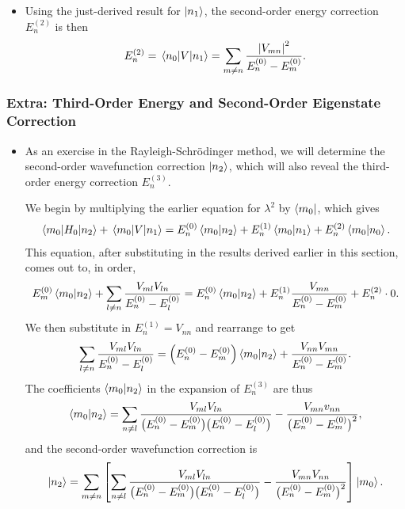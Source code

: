 \documentclass[11pt, a4paper]{article}
\newcommand{\Schro}{Schr\"{o}dinger\xspace}
\begin{document}
\begin{itemize}
    \item Using the just-derived result for $ \ket{n_{1}} $, the second-order energy correction $ E_{n}^{(2)} $ is then
    \begin{equation*}
        E_{n}^{(2)} = \mel{n_{0}}{V}{n_{1}} = \sum_{m \neq n} \frac{\abs{V_{mn}}^{2}}{E_{n}^{(0)} - E_{m}^{(0)}}.
    \end{equation*}

\end{itemize}

\subsubsection{Extra: Third-Order Energy and Second-Order Eigenstate Correction}
\begin{itemize}
    \item As an exercise in the Rayleigh-\Schro method, we will determine the second-order wavefunction correction $ \ket{n_{2}} $, which will also reveal the third-order energy correction $ E_{n}^{(3)} $. 

    We begin by multiplying the earlier equation for $ \lambda^{2} $ by $ \bra{m_{0}} $, which gives
    \begin{align*}
        \mel{m_{0}}{H_{0}}{n_{2}} + \mel{m_{0}}{V}{n_{1}} = E_{n}^{(0)} \braket{m_{0}}{n_{2}} + E_{n}^{(1)} \braket{m_{0}}{n_{1}} + E_{n}^{(2)}\braket{m_{0}}{n_{0}}.
    \end{align*}
    This equation, after substituting in the results derived earlier in this section, comes out to, in order,
    \begin{equation*}
        E_{m}^{(0)}\braket{m_{0}}{n_{2}} + \sum_{l \neq n}\frac{V_{ml}V_{ln}}{E_{n}^{(0)} - E_{l}^{(0)}} = E_{n}^{(0)}\braket{m_{0}}{n_{2}} + E_{n}^{(1)} \frac{V_{mn}}{E_{n}^{(0)} - E_{m}^{(0)}} + E_{n}^{(2)}\cdot 0.
    \end{equation*}
    We then substitute in $ E_{n}^{(1)} = V_{nn} $ and rearrange to get
    \begin{equation*}
        \sum_{l \neq n} \frac{V_{ml}V_{ln}}{E_{n}^{(0)} - E_{l}^{(0)}} = \left( E_{n}^{(0)} - E_{m}^{(0)} \right)\braket{m_{0}}{n_{2}} + \frac{V_{nn}V_{mn}}{E_{n}^{(0)} - E_{m}^{(0)}}.
    \end{equation*}
    The coefficients $ \braket{m_{0}}{n_{2}} $ in the expansion of $ E_{n}^{(3)} $ are thus
    \begin{equation*}
        \braket{m_{0}}{n_{2}} = \sum_{n \neq l} \frac{V_{ml}V_{ln}}{\big( E_{n}^{(0)} - E_{m}^{(0)} \big)\big( E_{n}^{(0)} - E_{l}^{(0)} \big)} - \frac{V_{mn}v_{nn}}{\big( E_{n}^{(0)} - E_{m}^{(0)} \big)^{2}},
    \end{equation*}
    and the second-order wavefunction correction is
    \begin{equation*}
        \ket{n_{2}} = \sum_{m \neq n} \left[ \sum_{n \neq l} \frac{V_{ml}V_{ln}}{\big( E_{n}^{(0)} - E_{m}^{(0)} \big)\big( E_{n}^{(0)} - E_{l}^{(0)} \big)} - \frac{V_{mn}V_{nn}}{\big( E_{n}^{(0)} - E_{m}^{(0)} \big)^{2}}  \right] \ket{m_{0}}.
    \end{equation*}


\end{itemize}
\end{document}
